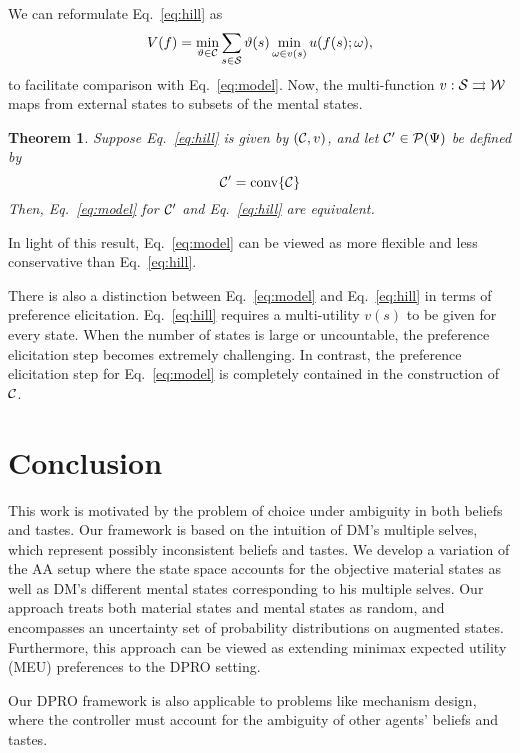 \documentclass[11pt,oneside]{article}
\theoremstyle{plain}
\theoremstyle{plain}
\theoremstyle{plain}
\newtheorem{thm}{Theorem}[section]
\theoremstyle{plain}
\theoremstyle{plain}
\theoremstyle{definition}
\theoremstyle{definition}
\theoremstyle{remark}
\theoremstyle{plain}
\newcommand{\calppsi}{{\cal P}(\Psi)}
\newcommand{\mcs}{{\cal S}}
\begin{document}
We can reformulate Eq.~\eqref{eq:hill} as
%
\begin{equation}
\label{eq:hill-1}
V(f) = \min_{\vartheta \in {\cal C}} \sum_{s \in \mcs} \vartheta(s) \min_{\omega \in v(s)} u(f(s); \omega),
\end{equation}
%
to facilitate comparison with Eq.~\eqref{eq:model}.
Now, the multi-function $v : \mcs \rightrightarrows {\cal W}$ maps from external states to subsets of the mental states.

\begin{thm}
\label{thm:hill_equivalence}
Suppose Eq.~\eqref{eq:hill} is given by $({\cal C}, v)$, and let ${\cal C}' \in \calppsi$ be defined by
$$
{\cal C}' = {\rm conv}\{{\cal C}\}
$$
Then, Eq.~\eqref{eq:model} for ${\cal C}'$ and Eq.~\eqref{eq:hill} are equivalent.
\end{thm}
\noindent
In light of this result, Eq.~\eqref{eq:model} can be viewed as more flexible and less conservative than Eq.~\eqref{eq:hill}.

There is also a distinction between Eq.~\eqref{eq:model} and Eq.~\eqref{eq:hill} in terms of preference elicitation.
Eq.~\eqref{eq:hill} requires a multi-utility $v(s)$ to be given for every state. When the number of states is large or uncountable, the preference elicitation step becomes extremely challenging.
In contrast, the preference elicitation step for Eq.~\eqref{eq:model} is completely contained in the construction of ${\cal C}$.






\section{Conclusion}
\label{sec:conclusion}

This work is motivated by the problem of choice under ambiguity in both beliefs and tastes. Our framework is based on the intuition of DM's multiple selves, which represent possibly inconsistent beliefs and tastes.
We develop a variation of the AA setup where the state space accounts for the objective material states as well as DM's different mental states corresponding to his multiple selves.
Our approach treats both material states and mental states as random, and encompasses an uncertainty set of probability distributions on augmented states.
Furthermore, this approach can be viewed as extending minimax expected utility (MEU) preferences to the DPRO setting.

Our DPRO framework is also applicable to problems like mechanism design, where the controller must account for the ambiguity of other agents' beliefs and tastes.
\end{document}
